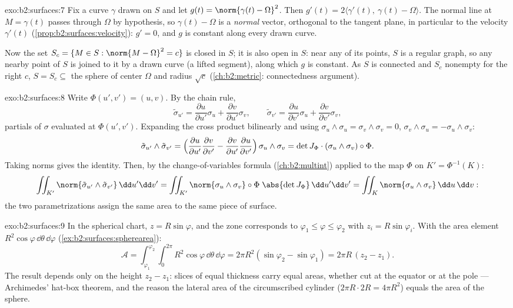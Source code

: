 \begin{solution}{exo:b2:surfaces:7}
Fix a curve $\gamma$ drawn on $S$ and let $g(t) = \norm{\gamma(t)
- \Omega}^2$. Then $g'(t) = 2\langle \gamma'(t),\ \gamma(t) -
\Omega\rangle$. The normal line at $M = \gamma(t)$ passes through
$\Omega$ by hypothesis, so $\gamma(t) - \Omega$ is a \emph{normal}
vector, orthogonal to the tangent plane, in particular to the
velocity $\gamma'(t)$ (\cref{prop:b2:surfaces:velocity}): $g' =
0$, and $g$ is constant along every drawn curve.

Now the set $S_c = \{M \in S : \norm{M - \Omega}^2 = c\}$ is
closed in $S$; it is also open in $S$: near any of its points, $S$
is a regular graph, so any nearby point of $S$ is joined to it by
a drawn curve (a lifted segment), along which $g$ is constant. As
$S$ is connected and $S_c$ nonempty for the right $c$, $S = S_c
\subseteq$ the sphere of center $\Omega$ and radius $\sqrt c$
(\cref{ch:b2:metric}: connectedness argument).
\end{solution}

\begin{solution}{exo:b2:surfaces:8}
Write $\Phi(u', v') = (u, v)$. By the chain rule,
\[
\tilde\sigma_{u'} = \frac{\partial u}{\partial u'}\sigma_u
+ \frac{\partial v}{\partial u'}\sigma_v,
\qquad
\tilde\sigma_{v'} = \frac{\partial u}{\partial v'}\sigma_u
+ \frac{\partial v}{\partial v'}\sigma_v ,
\]
partials of $\sigma$ evaluated at $\Phi(u',v')$. Expanding the
cross product bilinearly and using $\sigma_u \wedge \sigma_u =
\sigma_v \wedge \sigma_v = 0$, $\sigma_v \wedge \sigma_u =
-\sigma_u \wedge \sigma_v$:
\[
\tilde\sigma_{u'} \wedge \tilde\sigma_{v'}
= \Bigl(\frac{\partial u}{\partial u'}
\frac{\partial v}{\partial v'}
- \frac{\partial v}{\partial u'}
\frac{\partial u}{\partial v'}\Bigr)\,
\sigma_u \wedge \sigma_v
= \det J_\Phi \cdot (\sigma_u \wedge \sigma_v)\circ\Phi .
\]
Taking norms gives the identity. Then, by the change-of-variables
formula (\cref{ch:b2:multint}) applied to the map $\Phi$ on $K' =
\Phi^{-1}(K)$:
\[
\iint_{K'} \norm{\tilde\sigma_{u'} \wedge \tilde\sigma_{v'}}
\,\dd u'\dd v'
= \iint_{K'} \norm{\sigma_u \wedge \sigma_v}\circ\Phi\;
\abs{\det J_\Phi}\,\dd u'\dd v'
= \iint_K \norm{\sigma_u \wedge \sigma_v}\,\dd u\,\dd v :
\]
the two parametrizations assign the same area to the same piece of
surface.
\end{solution}

\begin{solution}{exo:b2:surfaces:9}
In the spherical chart, $z = R\sin\varphi$, and the zone
corresponds to $\varphi_1 \leq \varphi \leq \varphi_2$ with
$z_i = R\sin\varphi_i$. With the area element
$R^2\cos\varphi\,\dd\theta\,\dd\varphi$
(\cref{ex:b2:surfaces:spherearea}):
\[
\mathcal A = \int_{\varphi_1}^{\varphi_2}\!\!\int_0^{2\pi}
R^2\cos\varphi\,\dd\theta\,\dd\varphi
= 2\pi R^2(\sin\varphi_2 - \sin\varphi_1)
= 2\pi R\,(z_2 - z_1) .
\]
The result depends only on the height $z_2 - z_1$: slices of
equal thickness carry equal areas, whether cut at the equator
or at the pole --- Archimedes' hat-box theorem, and the reason
the lateral area of the circumscribed cylinder ($2\pi R \cdot
2R = 4\pi R^2$) equals the area of the sphere.
\end{solution}

